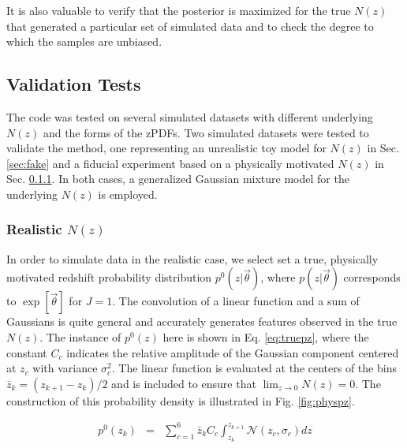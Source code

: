 \documentclass[preprint]{aastex}
\begin{document}
It is also valuable to verify that the posterior is maximized for the true $N(z)$ that generated a particular set of simulated data and to check the degree to which the samples are unbiased.

\clearpage
\subsection{Validation Tests}
\label{sec:valid}

The code was tested on several simulated datasets with different underlying $N(z)$ and the forms of the zPDFs.  Two simulated datasets were tested to validate the method, one representing an unrealistic toy model for $N(z)$ in Sec. \ref{sec:fake} and a fiducial experiment based on a physically motivated $N(z)$ in Sec. \ref{sec:null}.  In both cases, a generalized Gaussian mixture model for the underlying $N(z)$ is employed.

\clearpage
\subsubsection{Realistic $N(z)$}
\label{sec:null}

In order to simulate data in the realistic case, we select set a true, physically motivated redshift probability distribution $p^{0}(z|\vec{\theta})$, where $p(z|\vec{\theta})$ corresponds to $\exp[\vec{\theta}]$ for $J=1$.  The convolution of a linear function and a sum of Gaussians is quite general and accurately generates features observed in the true $N(z)$.  The instance of $p^{0}(z)$ here is shown in Eq. \ref{eq:truepz}, where the constant $C_{c}$ indicates the relative amplitude of the Gaussian component centered at $z_{c}$ with variance $\sigma_{c}^{2}$.  The linear function is evaluated at the centers of the bins $\bar{z}_{k}=(z_{k+1}-z_{k})/2$ and is included to ensure that $\lim_{z\to0}N(z)=0$.  The construction of this probability density is illustrated in Fig. \ref{fig:physpz}.  %

\begin{eqnarray}
\label{eq:truepz}
p^{0}(z_{k}) &=& \sum_{c=1}^{6}\bar{z}_{k}C_{c}\int_{z_{k}}^{z_{k+1}} \mathcal{N}(z_{c},\sigma_{c})dz
\end{eqnarray}

\end{document}
